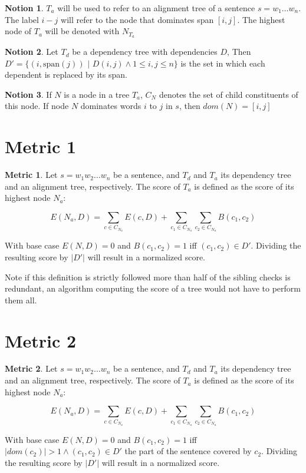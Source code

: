 \documentclass{report}
\theoremstyle{definition}
\newtheorem{metric}{Metric}
\newtheorem{notion}{Notion}
\theoremstyle{plain}
\begin{document}
\begin{notion}
$T_a$ will be used to refer to an alignment tree of a sentence $s = w_1 \dots w_n$. The label $i-j$ will refer to the node that dominates span $[i,j]$. The highest node of $T_a$ will be denoted with $N_{T_a}$
\end{notion}

\begin{notion}
Let $T_d$ be a dependency tree with dependencies $D$, Then $D' = \{ (i,\textrm{span}(j))$ $|$ $D(i,j) \land 1 \leq i,j \leq n \}$ is the set in which each dependent is replaced by its span.
\end{notion}

\begin{notion}
If $N$ is a node in a tree $T_a$, $C_N$ denotes the set of child constituents of this node. If node $N$ dominates words $i$ to $j$ in $s$, then $dom(N)= [i,j]$
\end{notion}

\section{Metric 1}

\begin{metric}\label{m1}
Let $s = w_1 w_2 \dots w_n$ be a sentence, and $T_d$ and $T_a$ its dependency tree and an alignment tree, respectively. The score of $T_a$ is defined as the score of its highest node $N_{a}$:

$$
E(N_a,D) = \sum_{c\in C_{N_a}} E(c,D)+ \sum_{c_1\in C_{N_a}} \sum_{c_2\in C_{N_a}} B(c_1,c_2)
$$

\noindent With base case $E(N,D) = 0$ and $B(c_1,c_2) = 1$ iff  $(c_1,c_2)\in D'$. Dividing the resulting score by $|D'|$ will result in a normalized score.
\end{metric}

\noindent  Note if this definition is strictly followed more than half of the sibling checks is redundant, an algorithm computing the score of a tree would not have to perform them all.

\section{Metric 2}

\begin{metric}\label{m2}
Let $s = w_1 w_2 \dots w_n$ be a sentence, and $T_d$ and $T_a$ its dependency tree and an alignment tree, respectively. The score of $T_a$ is defined as the score of its highest node $N_{a}$:

$$
E(N_a,D) = \sum_{c\in C_{N_a}} E(c,D)+ \sum_{c_1\in C_{N_a}} \sum_{c_2\in C_{N_a}} B(c_1,c_2)
$$

\noindent With base case $E(N,D) = 0$ and $B(c_1,c_2) = 1$ iff  $|dom(c_2)| > 1 \land (c_1,c_2)\in D'$ the part of the sentence covered by $c_2$. Dividing the resulting score by $|D'|$ will result in a normalized score.
\end{metric}
\end{document}
